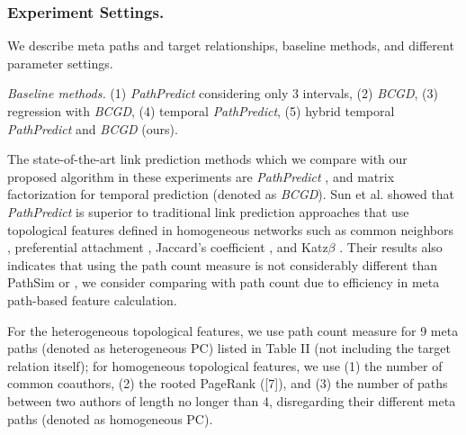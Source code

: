 
\subsubsection{Experiment Settings.} We describe meta paths and target relationships, baseline methods, and different parameter settings.

\textit{Baseline methods.} (1) \textit{PathPredict} considering only 3 intervals, (2) \textit{BCGD}, (3) regression with \textit{BCGD}, (4) temporal \textit{PathPredict}, (5) hybrid temporal \textit{PathPredict} and \textit{BCGD} (ours).

The state-of-the-art link prediction methods which we compare with our proposed algorithm in these experiments are \textit{PathPredict} \cite{sun2011ASONAM}, and matrix factorization for temporal prediction \cite{Zhu2016} (denoted as \textit{BCGD}). Sun et al. \cite{sun2011ASONAM} showed that \textit{PathPredict} is superior to traditional link prediction approaches that use topological features defined in homogeneous networks such as common neighbors \cite{newman2001clustering}, preferential attachment \cite{newman2001clustering}, Jaccard's coefficient \cite{liben2007link}, and Katz$\beta$ \cite{katz1953new}. Their results also indicates that using the path count measure is not considerably different than PathSim or , we consider comparing with path count due to efficiency in meta path-based feature calculation.



For the heterogeneous topological features, we use path count measure for 9 meta paths (denoted as heterogeneous PC) listed in Table II (not including the target relation itself); for homogeneous topological features, we use (1) the number of common coauthors, (2) the rooted PageRank ([7]), and (3) the number of paths between two authors of length no longer than 4, disregarding their different meta paths (denoted as homogeneous PC).

